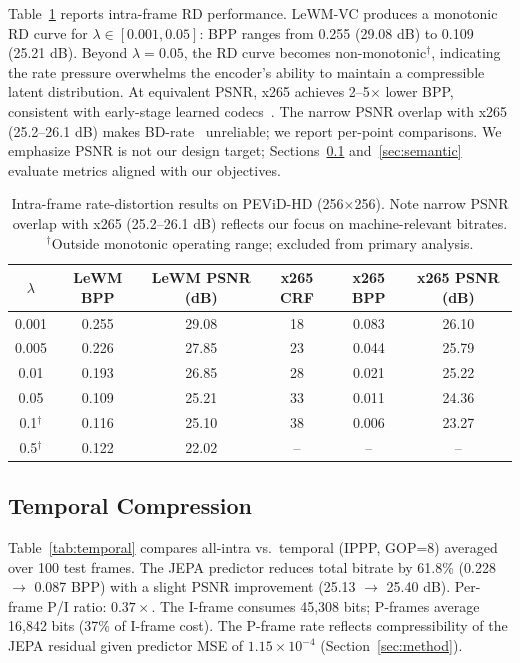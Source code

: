 \documentclass{article}
\begin{document}
Table~\ref{tab:rd} reports intra-frame RD performance. LeWM-VC produces a monotonic RD curve for $\lambda \in [0.001, 0.05]$: BPP ranges from 0.255 (29.08 dB) to 0.109 (25.21 dB). Beyond $\lambda{=}0.05$, the RD curve becomes non-monotonic$^\dag$, indicating the rate pressure overwhelms the encoder's ability to maintain a compressible latent distribution. At equivalent PSNR, x265 achieves 2--5$\times$ lower BPP, consistent with early-stage learned codecs~\cite{lu2019dvc,agustsson2020scale}. The narrow PSNR overlap with x265 (25.2--26.1 dB) makes BD-rate~\cite{bjontegaard2001bdrate} unreliable; we report per-point comparisons. We emphasize PSNR is not our design target; Sections~\ref{sec:temporal} and~\ref{sec:semantic} evaluate metrics aligned with our objectives.

\begin{table}[ht]
\centering
\caption{Intra-frame rate-distortion results on PEViD-HD (256$\times$256). Note narrow PSNR overlap with x265 (25.2--26.1 dB) reflects our focus on machine-relevant bitrates. $^\dag$Outside monotonic operating range; excluded from primary analysis.}
\label{tab:rd}
\vspace{4pt}
\begin{tabular}{cccccc}
\toprule
$\lambda$ & LeWM BPP & LeWM PSNR (dB) & x265 CRF & x265 BPP & x265 PSNR (dB) \\
\midrule
0.001 & 0.255 & 29.08 & 18 & 0.083 & 26.10 \\
0.005 & 0.226 & 27.85 & 23 & 0.044 & 25.79 \\
0.01  & 0.193 & 26.85 & 28 & 0.021 & 25.22 \\
0.05  & 0.109 & 25.21 & 33 & 0.011 & 24.36 \\
0.1$^\dag$   & 0.116 & 25.10 & 38 & 0.006 & 23.27 \\
0.5$^\dag$   & 0.122 & 22.02 & -- & --     & --     \\
\bottomrule
\end{tabular}
\end{table}

\subsection{Temporal Compression}
\label{sec:temporal}

Table~\ref{tab:temporal} compares all-intra vs.\ temporal (IPPP, GOP=8) averaged over 100 test frames. The JEPA predictor reduces total bitrate by 61.8\% (0.228 $\rightarrow$ 0.087 BPP) with a slight PSNR improvement (25.13 $\rightarrow$ 25.40 dB). Per-frame P/I ratio: $0.37{\times}$. The I-frame consumes 45,308 bits; P-frames average 16,842 bits (37\% of I-frame cost). The P-frame rate reflects compressibility of the JEPA residual given predictor MSE of $1.15{\times}10^{-4}$ (Section~\ref{sec:method}).
\end{document}
